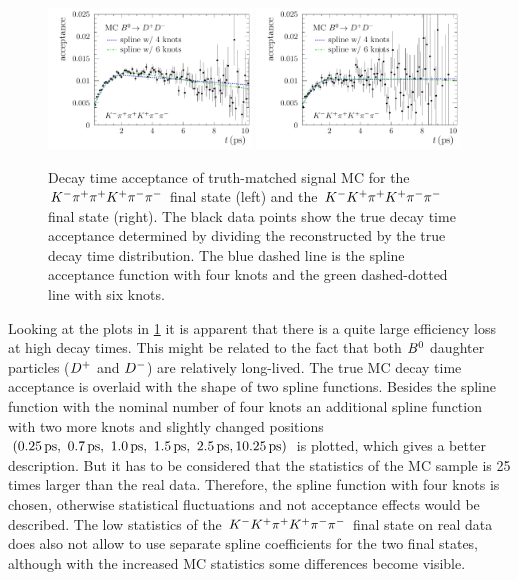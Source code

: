 \begin{figure}[htb]
\centering
\includegraphics[width=0.48\textwidth]{07-B02DD/tikz/pdf/Acceptancespline_nolog_MC_Kpipi.pdf}
\includegraphics[width=0.48\textwidth]{07-B02DD/tikz/pdf/Acceptancespline_nolog_MC_KKpi.pdf}
\caption{Decay time acceptance of truth-matched signal MC for the ${{K}^-}{{\pi}^+}{{\pi}^+}{{K}^+}{{\pi}^-}{{\pi}^-}$
final state (left) and the ${{K}^-}{{K}^+}{{\pi}^+}{{K}^+}{{\pi}^-}{{\pi}^-}$ final state (right). The black data
points show the true decay time acceptance determined by dividing the
reconstructed by the true decay time distribution. The blue dashed line is the
spline acceptance function with four knots and the green dashed-dotted line
with six knots.}
\label{fig:b02dd:decaytimefit:acceptance_MC}
\end{figure}

Looking at the plots in \cref{fig:b02dd:decaytimefit:acceptance_MC} it is
apparent that there is a quite large efficiency loss at high decay times. This
might be related to the fact that both ${{B}^0}$ daughter particles (${{D}^+}$ and
${{D}^-}$) are relatively long-lived. The true MC decay time acceptance is
overlaid with the shape of two spline functions. Besides the spline function
with the nominal number of four knots an additional spline function with two
more knots and slightly changed positions $(\SIlist[list-final-separator={,
}]{0.25;0.7;1.0;1.5;2.5;10.25}{\ps})$ is plotted, which gives a better
description. But it has to be considered that the statistics of the MC sample
is \num{25} times larger than the real data. Therefore, the spline function
with four knots is chosen, otherwise statistical fluctuations and not
acceptance effects would be described. The low statistics of the ${{K}^-}{{K}^+}{{\pi}^+}{{K}^+}{{\pi}^-}{{\pi}^-}$
final state on real data does also not allow to use separate spline
coefficients for the two final states, although with the increased MC
statistics some differences become visible.
